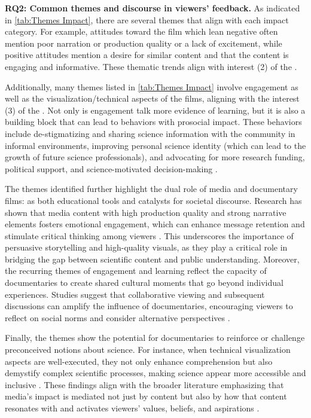 \vspace{0.2cm}
\noindent\textbf{RQ2: Common themes and discourse in viewers' feedback.}
As indicated in \autoref{tab:Themes Impact}, there are several themes that align with each impact category.  For example, attitudes toward the film which lean negative often mention poor narration or production quality or a lack of excitement, while positive attitudes mention a desire for similar content and that the content is engaging and informative.  These thematic trends align with interest (2) of the \avlshort. 

Additionally, many themes listed in \autoref{tab:Themes Impact} involve engagement as well as the visualization/technical aspects of the films, aligning with the interest (3) of the \avlshort. 
Not only is engagement talk more evidence of learning, but it is also a building block that can lead to behaviors with prosocial impact. These behaviors include de-stigmatizing and sharing science information with the community in informal environments, improving personal science identity (which can lead to the growth of future science professionals), and advocating for more research funding, political support, and science-motivated decision-making \citep[e.g.,][]{lee_robbins_affective_2022}.

The themes identified further highlight the dual role of media and documentary films: as both educational tools and catalysts for societal discourse. Research has shown that media content with high production quality and strong narrative elements fosters emotional engagement, which can enhance message retention and stimulate critical thinking among viewers \citep{borkiewicz2019cinematic,arroio2010,franconeri2021science,lee2022affective}. This underscores the importance of persuasive storytelling and high-quality visuals, as they play a critical role in bridging the gap between scientific content and public understanding.
Moreover, the recurring themes of engagement and learning reflect the capacity of documentaries to create shared cultural moments that go beyond individual experiences. Studies suggest that collaborative viewing and subsequent discussions can amplify the influence of documentaries, encouraging viewers to reflect on social norms and consider alternative perspectives \cite{whiteman2009documentary,hirsch2007documentaries}.

Finally, the themes show the potential for documentaries to reinforce or challenge preconceived notions about science. For instance, when technical visualization aspects are well-executed, they not only enhance comprehension but also demystify complex scientific processes, making science appear more accessible and inclusive \cite{yang2020power}. These findings align with the broader literature emphasizing that media's impact is mediated not just by content but also by how that content resonates with and activates viewers' values, beliefs, and aspirations \cite{rezapour2017classification}. 


